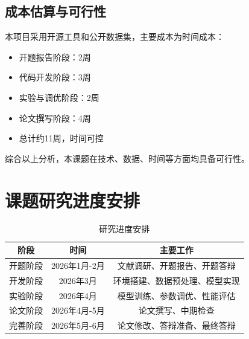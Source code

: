 \documentclass[supercite]{Hust-undergraduate-kaiti}
\theoremstyle{definition}
\begin{document}
\subsection{成本估算与可行性}

本项目采用开源工具和公开数据集，主要成本为时间成本：
\begin{itemize}
    \item 开题报告阶段：2周
    \item 代码开发阶段：3周
    \item 实验与调优阶段：2周
    \item 论文撰写阶段：4周
    \item 总计约11周，时间可控
\end{itemize}

综合以上分析，本课题在技术、数据、时间等方面均具备可行性。

\section{课题研究进度安排}

\begin{table}[htb]
\centering
\caption{研究进度安排}
\begin{tabular}{|c|c|c|}
\hline
\textbf{阶段} & \textbf{时间} & \textbf{主要工作} \\ \hline
开题阶段 & 2026年1月-2月 & 文献调研、开题报告、开题答辩 \\ \hline
开发阶段 & 2026年3月 & 环境搭建、数据预处理、模型实现 \\ \hline
实验阶段 & 2026年4月 & 模型训练、参数调优、性能评估 \\ \hline
论文阶段 & 2026年4月-5月 & 论文撰写、中期检查 \\ \hline
完善阶段 & 2026年5月-6月 & 论文修改、答辩准备、最终答辩 \\ \hline
\end{tabular}
\end{table}
\end{document}

